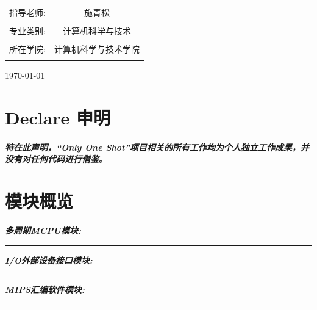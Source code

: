 \documentclass[11pt]{article}
\begin{document}
\begin{titlepage}
\begin{center}
\begin{center}
\begin{large}
\begin{tabular}{cc}
                    \cline{2-2}                                \\
                    指导老师:    & 施青松                      \\
                    \cline{2-2}                                \\
                    专业类别:    & 计算机科学与技术            \\
                    \cline{2-2}                                \\
                    所在学院:    & 计算机科学与技术学院        \\
                    \cline{2-2}                                \\
                \end{tabular}
            \end{large}
        \end{center}
        \LARGE\today
    \end{center}

\end{titlepage}



\newpage
\thispagestyle{empty} %

\section*{\LARGE  Declare 申明}
\paragraph{}
\textit{\bfseries \songti
    特在此声明，“Only One Shot”项目相关的所有工作均为个人独立工作成果，并没有对任何代码进行借鉴。}
\section*{\LARGE  模块概览}

\noindent  \textit{\bfseries \songti 多周期MCPU模块:} \\[1mm]
\rule[1em]{25em}{0.5pt}

\noindent  \textit{\bfseries \songti I/O外部设备接口模块:}\\[1mm]
\rule[1em]{25em}{0.5pt}

\noindent \textit{\bfseries \songti MIPS汇编软件模块:}\\[1mm]
\rule[1em]{25em}{0.5pt}
\end{document}
